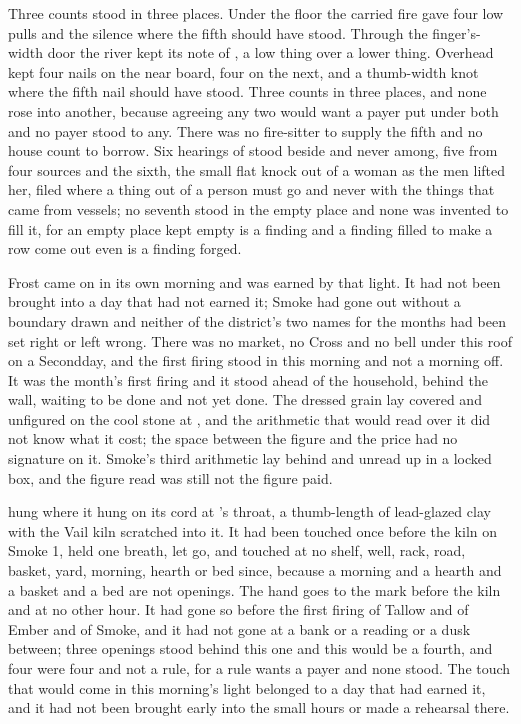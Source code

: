 Three counts stood in three places. Under the floor the carried fire gave four low pulls and the silence where the fifth should have stood. Through the finger's-width door the river kept its note of , a low thing over a lower thing. Overhead  kept four nails on the near board, four on the next, and a thumb-width knot where the fifth nail should have stood. Three counts in three places, and none rose into another, because agreeing any two would want a payer put under both and no payer stood to any. There was no fire-sitter to supply the fifth and no house count to borrow. Six hearings of  stood beside and never among, five from four sources and the sixth, the small flat knock out of a woman as the men lifted her, filed where a thing out of a person must go and never with the things that came from vessels; no seventh stood in the empty place and none was invented to fill it, for an empty place kept empty is a finding and a finding filled to make a row come out even is a finding forged.

Frost came on in its own morning and was earned by that light. It had not been brought into a day that had not earned it; Smoke had gone out without a boundary drawn and neither of the district's two names for the months had been set right or left wrong. There was no market, no Cross and no bell under this roof on a Secondday, and the first firing stood in this morning and not a morning off. It was the month's first firing and it stood ahead of the household, behind the wall, waiting to be done and not yet done. The dressed grain lay covered and unfigured on the cool stone at , and the arithmetic that would read over it did not know what it cost; the space between the figure and the price had no signature on it. Smoke's third arithmetic lay behind and unread up  in a locked box, and the figure read was still not the figure paid.

 hung where it hung on its cord at 's throat, a thumb-length of lead-glazed clay with the Vail kiln scratched into it. It had been touched once before the kiln on Smoke 1, held one breath, let go, and touched at no shelf, well, rack, road, basket, yard, morning, hearth or bed since, because a morning and a hearth and a basket and a bed are not openings. The hand goes to the mark before the kiln and at no other hour. It had gone so before the first firing of Tallow and of Ember and of Smoke, and it had not gone at a bank or a reading or a dusk between; three openings stood behind this one and this would be a fourth, and four were four and not a rule, for a rule wants a payer and none stood. The touch that would come in this morning's light belonged to a day that had earned it, and it had not been brought early into the small hours or made a rehearsal there.


